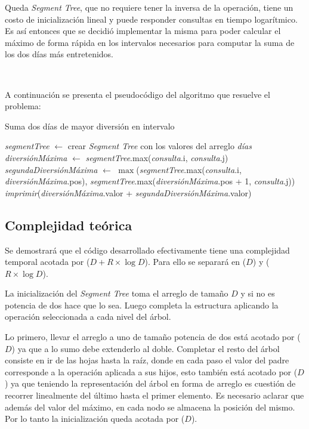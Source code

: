 Queda \emph{Segment Tree}, que no requiere tener la inversa de la operación,
tiene un costo de inicialización lineal y puede responder consultas en tiempo
logarítmico. Es así entonces que se decidió implementar la misma para poder
calcular el máximo de forma rápida en los intervalos necesarios para computar la
suma de los dos días más entretenidos.

~

A continuación se presenta el pseudocódigo del algoritmo que resuelve el problema:

\begin{algorithm}[H]
	\caption{Suma dos días de mayor diversión en intervalo}
	\Input{Arreglo \emph{días} de longitud $D$ con enteros positivos denotando
	la diversión para cada día y arreglo \emph{consultas} con pares $[i, j)$.}
	\emph{segmentTree} $\gets$ crear \emph{Segment Tree} con los valores del
	arreglo \emph{días} \;
	 {
		\emph{diversiónMáxima} $\gets$ \emph{segmentTree}.max(\emph{consulta}.i, \emph{consulta}.j) \;
		\emph{segundaDiversiónMáxima} $\gets$
		$\max$(\emph{segmentTree}.max(\emph{consulta}.i,
		\emph{diversiónMáxima}.pos),
		\emph{segmentTree}.max(\emph{diversiónMáxima}.pos + 1, \emph{consulta}.j))
		\;
		\emph{imprimir}(\emph{diversiónMáxima}.valor +
		\emph{segundaDiversiónMáxima}.valor) \;
	}
\end{algorithm}

\subsection{Complejidad teórica}

Se demostrará que el código desarrollado efectivamente tiene una complejidad
temporal acotada por \ord($D + R \times \log{D}$). Para ello se separará en
\ord($D$) y \ord($R \times \log{D}$).

La inicialización del \emph{Segment Tree} toma el arreglo de tamaño $D$ y si no
es potencia de dos hace que lo sea. Luego completa la estructura aplicando la
operación seleccionada a cada nivel del árbol.

Lo primero, llevar el arreglo a uno de tamaño potencia de dos está acotado por
\ord($D$) ya que a lo sumo debe extenderlo al doble. Completar el resto del
árbol consiste en ir de las hojas hasta la raíz, donde en cada paso el valor del
padre corresponde a la operación aplicada a sus hijos, esto también está acotado
por \ord($D$) ya que teniendo la representación del árbol en forma de arreglo es
cuestión de recorrer linealmente del último hasta el primer elemento. Es
necesario aclarar que además del valor del máximo, en cada nodo se almacena la
posición del mismo. Por lo tanto la inicialización queda acotada por \ord($D$).

